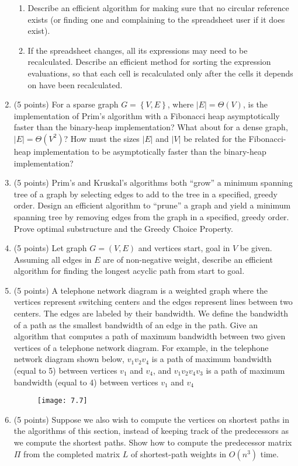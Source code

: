 \documentclass[12pt]{report}
\begin{document}
\begin{enumerate}[label=\arabic*.]
	\begin{enumerate}[label=\arabic{enumi}\alph*)]
	    \item Describe an efficient algorithm for making sure that no circular reference exists (or finding one and complaining to the spreadsheet user if it does exist).
		\item If the spreadsheet changes, all its expressions may need to be recalculated. Describe an efficient method for sorting the expression evaluations, so that each cell is recalculated only after the cells it depends on have been recalculated.
	\end{enumerate}
	\item (5 points) For a sparse graph $G=\left\{V,E\right\}$, where $|E|=\Theta(V)$, is the implementation of Prim’s algorithm with a Fibonacci heap asymptotically faster than the binary-heap implementation? What about for a dense graph, $|E|=\Theta(V^{2})$? How must the sizes $|E|$ and $|V|$ be related for the Fibonacci-heap implementation to be asymptotically faster than the binary-heap implementation?
	\item (5 points) Prim’s and Kruskal’s algorithms both ``grow'' a minimum spanning tree of a graph by selecting edges to add to the tree in a specified, greedy order. Design an efficient algorithm to ``prune'' a graph and yield a minimum spanning tree by removing edges from the graph in a specified, greedy order. Prove optimal substructure and the Greedy Choice Property.
	\item (5 points) Let graph $G=\left(V,E\right)$ and vertices start, goal in $V$ be given. Assuming all edges in $E$ are of non-negative weight, describe an efficient algorithm for finding the longest acyclic path from start to goal.
	\item (5 points) A telephone network diagram is a weighted graph where the vertices represent switching centers and the edges represent lines between two centers. The edges are labeled by their bandwidth. We define the bandwidth of a path as the smallest bandwidth of an edge in the path. Give an algorithm that computes a path of maximum bandwidth between two given vertices of a telephone network diagram. For example, in the telephone network diagram shown below, $v_{1}v_{2}v_{4}$ is a path of maximum bandwidth (equal to 5) between vertices $v_{1}$ and $v_{4}$, and $v_{1}v_{2}v_{4}v_{3}$ is a path of maximum bandwidth (equal to 4) between vertices $v_{1}$ and $v_{4}$ \begin{figure}[H]
	\centering
	\texttt{[image: 7.7]}
	\caption{}
	\label{fig:7}
\end{figure}

	\item (5 points) Suppose we also wish to compute the vertices on shortest paths in the algorithms of this section, instead of keeping track of the predecessors as we compute the shortest paths. Show how to compute the predecessor matrix $\Pi$ from the completed matrix $L$ of shortest-path weights in $O(n^{3})$ time.
\end{enumerate}
\end{document}
